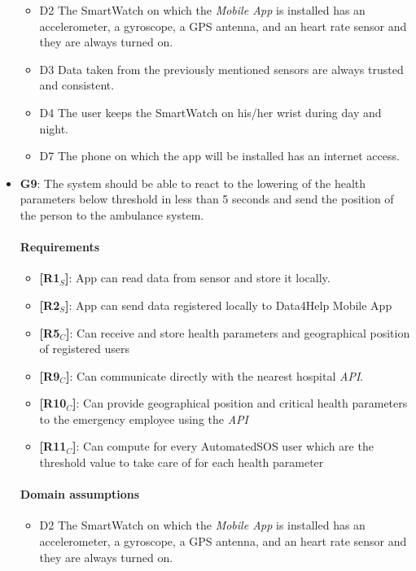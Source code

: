 \begin{itemize}
\begin{itemize}
    \item  D2  The SmartWatch on which the \textit{Mobile App} is installed has an accelerometer, a gyroscope, a GPS antenna, and an heart rate sensor and they are always turned on.
    
    \item  D3  Data taken from the previously mentioned sensors are always trusted and consistent.
            
    \item  D4  The user keeps the SmartWatch on his/her wrist during day and night.
    
     \item  D7  The phone on which the app will be installed has an internet access.
 
   \end{itemize}
   
   
    \item \textbf{G9}: The system should be able to react to the lowering of the health parameters below threshold in less than 5 seconds and send the position of the person to the ambulance system. 
    \paragraph{Requirements}
   \begin{itemize}
    \item \textbf{[R1$_S$]}: App can read data from sensor and store it locally.
    \item \textbf{[R2$_S$]}: App can send data registered locally to Data4Help Mobile App

    \item \textbf{[R5$_C$]}: Can receive and store health parameters and geographical position of registered users

    \item \textbf{[R9$_C$]}: Can communicate directly with the nearest hospital \textit{API}.
    \item \textbf{[R10$_C$]}: Can provide geographical position and critical health parameters to the emergency employee using the \textit{API}
    \item \textbf{[R11$_C$]}: Can compute for every AutomatedSOS user which are the threshold value to take care of for each health parameter

   \end{itemize}
   \paragraph{Domain assumptions}
   \begin{itemize}
    \item  D2  The SmartWatch on which the \textit{Mobile App} is installed has an accelerometer, a gyroscope, a GPS antenna, and an heart rate sensor and they are always turned on.
    

\end{itemize}
\end{itemize}
